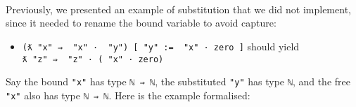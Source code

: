 \begin{fence}
\begin{code}
\AgdaSymbol{((}\AgdaSpace{}%
\AgdaSpace{}%
\AgdaOperator{\AgdaFunction{\#}}\AgdaSpace{}%
\AgdaSymbol{)}\AgdaSpace{}%
\AgdaSpace{}%
\AgdaOperator{\AgdaFunction{\#}}\AgdaSpace{}%
\AgdaSymbol{)}\<%
\\
%
\\[\AgdaEmptyExtraSkip]%
\>[0]\AgdaFunction{\AgdaUnderscore{}}\AgdaSpace{}%
\AgdaSymbol{:}\AgdaSpace{}%
\AgdaSpace{}%
\AgdaOperator{\AgdaFunction{[}}\AgdaSpace{}%
\AgdaSpace{}%
\AgdaOperator{\AgdaFunction{]}}\AgdaSpace{}%
\AgdaSpace{}%
\<%
\\
\>[0]\AgdaSymbol{\AgdaUnderscore{}}\AgdaSpace{}%
\AgdaSymbol{=}\AgdaSpace{}%
\<%
\end{code}
\end{fence}

Previously, we presented an example of substitution that we did not
implement, since it needed to rename the bound variable to avoid
capture:

\begin{itemize}
\tightlist
\item
  \texttt{(ƛ\ "x"\ ⇒\ \textasciigrave{}\ "x"\ ·\ \textasciigrave{}\ "y")\ {[}\ "y"\ :=\ \textasciigrave{}\ "x"\ ·\ \textasciigrave{}zero\ {]}}
  should yield
  \texttt{ƛ\ "z"\ ⇒\ \textasciigrave{}\ "z"\ ·\ (\textasciigrave{}\ "x"\ ·\ \textasciigrave{}zero)}
\end{itemize}

Say the bound \texttt{"x"} has type
\texttt{\textasciigrave{}ℕ\ ⇒\ \textasciigrave{}ℕ}, the substituted
\texttt{"y"} has type \texttt{\textasciigrave{}ℕ}, and the free
\texttt{"x"} also has type
\texttt{\textasciigrave{}ℕ\ ⇒\ \textasciigrave{}ℕ}. Here is the example
formalised:

